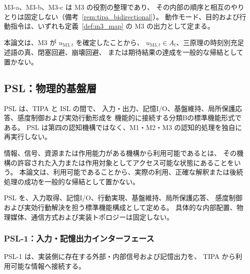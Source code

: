 M3-a、M3-b、M3-c は M3 の役割の整理であり、
その内部の順序と相互のやりとりは固定しない（備考~\ref{rem:tipa_bidirectional}）。
動作モード、目的および行動指令は、いずれも定義~\ref{def:m3_map} の M3 の出力として定まる。

\begin{remark}[M3の成功非保証]
\label{rem:m3_output_quality}
本論文は、M3 が $u_{\mathrm{M3},t}$ を確定したことから、
$u_{\mathrm{M3},t}\in A_t$、三原理の時刻別充足述語の真、閉塞回避、崩壊回避、
または期待結果の達成を一般的な帰結として置かない。
\end{remark}

\subsection{PSL：物理的基盤層}
\label{subsec:psl}

PSL は、TIPA と ISL の間で、
入力・出力、記憶I/O、基盤維持、局所保護応答、感度制御および実効行動形成を
機能的に接続する分類Bの標準機能形式である。
PSL は第四の認知機構ではなく、M1・M2・M3 の認知的処理を独自に再実行しない。

\begin{definition}
\label{def:psl_availability}
情報、信号、資源または作用能力がある機構から利用可能であるとは、
その機構の許容された入力または作用対象としてアクセス可能な状態にあることをいう。
本論文は、利用可能であることから、実際の利用、正確な解釈または後続処理の成功を一般的な帰結として置かない。
\end{definition}

\begin{definition}
\label{def:psl}
PSL を、入力取得、記憶I/O、行動実現、基盤維持、局所保護応答、
感度制御および実効行動解決を担う標準機能構成として定める。
具体的な内部配置、物理媒体、通信方式および実装トポロジーは固定しない。
\end{definition}

\subsubsection{PSL-1：入力・記憶出力インターフェース}
\label{subsubsec:psl1}

PSL-1 は、実装側に存在する外部・内部信号および記憶出力を、
TIPA から利用可能な情報へ接続する。

